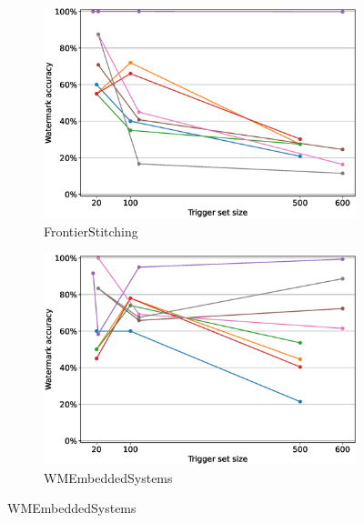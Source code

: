 \begin{figure}
\begin{subfigure}{0.41\linewidth}
        \includegraphics[width=\linewidth]{images/finetuning/FrontierStitching_finetuning_per_method_smalllr.eps}
        \caption{FrontierStitching}
        \label{fig:finetuning-smalllr-permethod-frontier}
    \end{subfigure}
    \quad
    \begin{subfigure}{0.41\linewidth}
        \includegraphics[width=\linewidth]{images/finetuning/WMEmbeddedSystems_finetuning_per_method_smalllr.eps}
        \caption{WMEmbeddedSystems}
        \label{fig:finetuning-smalllr-permethod-embedded}
    \end{subfigure}
    \quad


\end{figure}
